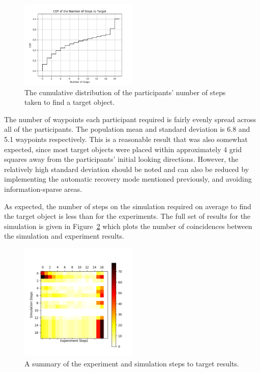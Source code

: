\documentclass[a4paper, twoside]{article}
\begin{document}
\begin{figure}
  \centering
  \includegraphics[width=0.5\textwidth]{figures/cdf_total_steps.png}
  \caption{The cumulative distribution of the participants' number of steps taken to find a target object. }\label{fig:nsteps-participants}
\end{figure}

The number of waypoints each participant required is fairly evenly spread across all of the participants. The population mean and standard deviation is 6.8 and 5.1 waypoints respectively. This is a reasonable result that was also somewhat expected, since most target objects were placed within approximately 4 grid squares away from the participants' initial looking directions. However, the relatively high standard deviation should be noted and can also be reduced by implementing the automatic recovery mode mentioned previously, and avoiding information-sparse areas.

As expected, the number of steps on the simulation required on average to find the target object is less than for the experiments. The full set of results for the simulation is given in Figure~\ref{fig:sim-vs-experiment} which plots the number of coincidences between the simulation and experiment results.

\begin{figure}
  \centering
  \includegraphics[width=0.5\textwidth]{figures/experiment_vs_simulation.png}
  \caption{A summary of the experiment and simulation steps to target results. }\label{fig:sim-vs-experiment}
\end{figure}
\end{document}
